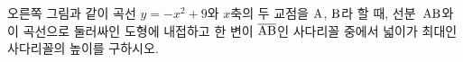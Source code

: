 \noindent\begin{minipage}[t]{0.58\linewidth}\vspace{0pt}\raggedright 오른쪽 그림과 같이 곡선 $y=-x^2+9$와 $x$축의 두 교점을 $\mathrm{A}$, $\mathrm{B}$라 할 때, 선분~$\mathrm{AB}$와 이 곡선으로 둘러싸인 도형에 내접하고 한 변이 $\overline{\mathrm{AB}}$인 사다리꼴 중에서 넓이가 최대인 사다리꼴의 높이를 구하시오.\end{minipage}\hfill\begin{minipage}[t]{0.4\linewidth}\vspace{0pt}\centering \resizebox{\ifdim\width>\linewidth\linewidth\else\width\fi}{!}{}\end{minipage}\par
